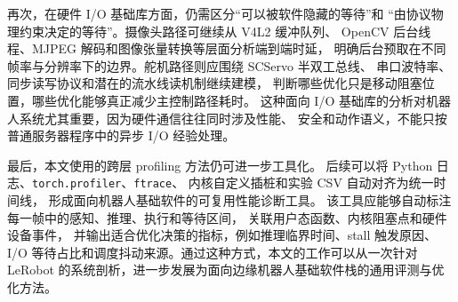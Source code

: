 再次，在硬件 I/O 基础库方面，仍需区分``可以被软件隐藏的等待''和
``由协议物理约束决定的等待''。摄像头路径可继续从 V4L2 缓冲队列、
OpenCV 后台线程、MJPEG 解码和图像张量转换等层面分析端到端时延，
明确后台预取在不同帧率与分辨率下的边界。舵机路径则应围绕 SCServo 半双工总线、
串口波特率、同步读写协议和潜在的流水线读机制继续建模，
判断哪些优化只是移动阻塞位置，哪些优化能够真正减少主控制路径耗时。
这种面向 I/O 基础库的分析对机器人系统尤其重要，因为硬件通信往往同时涉及性能、
安全和动作语义，不能只按普通服务器程序中的异步 I/O 经验处理。

最后，本文使用的跨层 profiling 方法仍可进一步工具化。
后续可以将 Python 日志、\texttt{torch.profiler}、\texttt{ftrace}、
内核自定义插桩和实验 CSV 自动对齐为统一时间线，
形成面向机器人基础软件的可复用性能诊断工具。
该工具应能够自动标注每一帧中的感知、推理、执行和等待区间，
关联用户态函数、内核阻塞点和硬件设备事件，
并输出适合优化决策的指标，例如推理临界时间、stall 触发原因、
I/O 等待占比和调度抖动来源。通过这种方式，本文的工作可以从一次针对 LeRobot
的系统剖析，进一步发展为面向边缘机器人基础软件栈的通用评测与优化方法。
